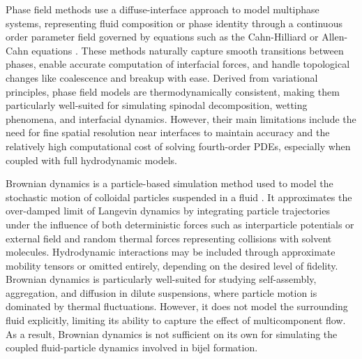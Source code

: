 Phase field methods use a diffuse-interface approach to model multiphase systems, representing fluid composition or phase identity through a continuous 
order parameter field governed by equations such as the Cahn-Hilliard or Allen-Cahn equations 
\cite{mendoza_evolution_2006, carmack_tuning_2018, chan_channel_2012}. These methods naturally capture smooth transitions between phases, enable
accurate computation of interfacial forces, and handle topological changes like coalescence and breakup with ease. Derived from variational principles, 
phase field models are thermodynamically consistent, making them particularly well-suited for simulating spinodal decomposition, wetting phenomena, and 
interfacial dynamics. However, their main limitations include the need for fine spatial resolution near interfaces to maintain accuracy and the relatively 
high computational cost of solving fourth-order PDEs, especially when coupled with full hydrodynamic models.

Brownian dynamics is a particle-based simulation method used to model the stochastic motion of colloidal particles suspended in a fluid 
\cite{huber_brownian_2019, yip_brownian_2005, elsawy_utility_2025}. It approximates the over-damped limit of Langevin dynamics by integrating 
particle trajectories under the influence of both deterministic forces such as interparticle potentials or external field and random thermal 
forces representing collisions with solvent molecules. Hydrodynamic interactions may be included through approximate mobility tensors or omitted 
entirely, depending on the desired level of fidelity. Brownian dynamics is particularly well-suited for studying self-assembly, aggregation, and 
diffusion in dilute suspensions, where particle motion is dominated by thermal fluctuations. However, it does not model the surrounding fluid 
explicitly, limiting its ability to capture the effect of multicomponent flow. As a result, Brownian dynamics is not sufficient 
on its own for simulating the coupled fluid-particle dynamics involved in bijel formation.

